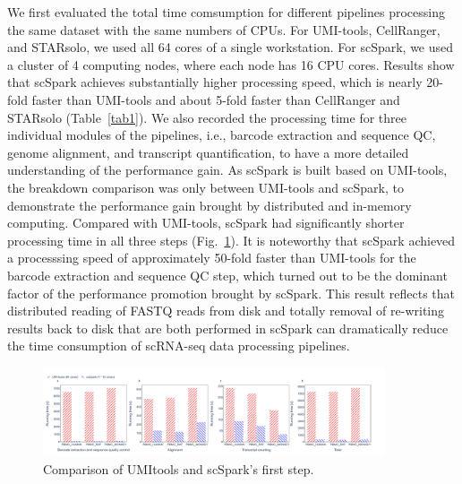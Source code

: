 \documentclass[conference]{IEEEtran}
\begin{document}
We first evaluated the total time comsumption for different pipelines processing the same dataset with the same numbers of CPUs. 
For UMI-tools, CellRanger, and STARsolo, we used all 64 cores of a single workstation. 
For scSpark, we used a cluster of 4 computing nodes, where each node has 16 CPU cores. 
Results show that scSpark achieves substantially higher processing speed, which is nearly 20-fold faster than UMI-tools and about 5-fold faster than CellRanger and STARsolo (Table~\ref{tab1}). 
We also recorded the processing time for three individual modules of the pipelines, i.e., barcode extraction and sequence QC, genome alignment, and transcript quantification, to have a more detailed understanding of the performance gain. 
As scSpark is built based on UMI-tools, the breakdown comparison was only between UMI-tools and scSpark, to demonstrate the performance gain brought by distributed and in-memory computing. Compared with UMI-tools, scSpark had significantly shorter processing time in all three steps (Fig.~\ref{fig4}). It is noteworthy that scSpark achieved a processsing speed of approximately 50-fold faster than UMI-tools for the barcode extraction and sequence QC step, which turned out to be the dominant factor of the performance promotion brought by scSpark. This result reflects that distributed reading of FASTQ reads from disk and totally removal of re-writing results back to disk that are both performed in scSpark can dramatically reduce the time consumption of scRNA-seq data processing pipelines. 

\begin{figure}
	\centering
	\includegraphics[width=0.9\textwidth]{fig4.pdf}
	\caption{Comparison of UMI\-tools and scSpark's first step.} \label{fig4}
\end{figure}
\end{document}
